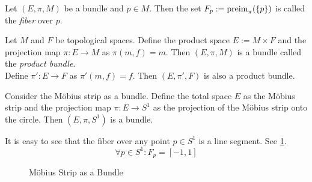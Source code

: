 \begin{definition}[Fiber]\label{def:fiber}
	Let \((E, \pi, M)\) be a bundle and \(p \in M\). Then the set \(F_p := \operatorname{preim}_{\pi}(\qty{p})\) is called the \emph{fiber} over \(p\).
\end{definition}

\begin{example}
	Let \(M\) and \(F\) be topological spaces. Define the product space \(E := M \times F\) and the projection map \(\pi: E \to M\) as \(\pi(m, f) = m\). Then \((E, \pi, M)\) is a bundle called the \emph{product bundle}. \\
	Define \(\pi': E \to F\) as \(\pi'(m, f) = f\). Then \((E, \pi', F)\) is also a product bundle.
\end{example}

\begin{example}
	Consider the M\"obius strip as a bundle. Define the total space \(E\) as the M\"obius strip and the projection map \(\pi: E \to S^1\) as the projection of the M\"obius strip onto the circle. Then \((E, \pi, S^1)\) is a bundle.

	It is easy to see that the fiber over any point \(p \in S^1\) is a line segment. See \cref{fig:moebius-strip-bundle}.
	\begin{equation}
		\forall p \in S^1: F_p = [-1, 1]
	\end{equation}
	\begin{figure}[H]
		\centering
		\caption{M\"obius Strip as a Bundle}
		\label{fig:moebius-strip-bundle}
	\end{figure}
\end{example}

